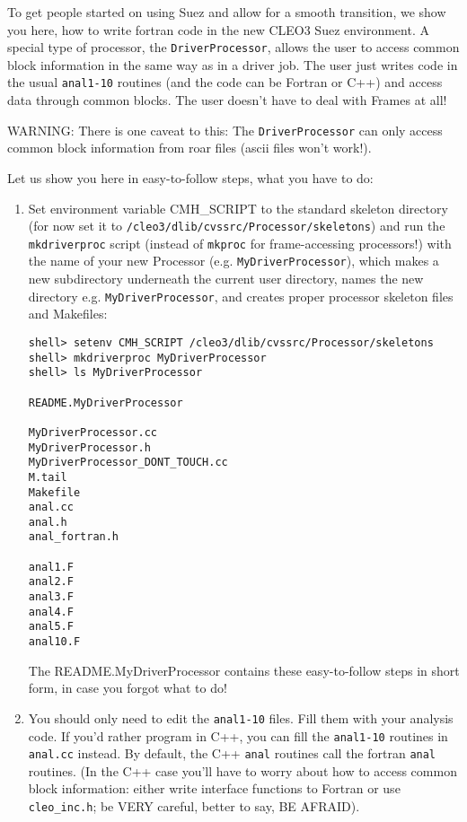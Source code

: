 \documentclass[12pt]{article}
\begin{document}
To get people started on using Suez and allow for a smooth transition,
we show you here, how to write fortran code in the new CLEO3 Suez
environment.  A special type of processor, the \texttt{DriverProcessor},
allows the user to access common block  information
in the same way as in a driver job.  The user just writes code in the
usual \texttt{anal1-10} routines (and the code can be Fortran or C++)
and access data through common blocks. The user doesn't have to deal
with Frames at all!

\noindent WARNING: There is one caveat to this: The
\texttt{DriverProcessor} can only access common block information from
roar files (ascii files won't work!).

Let us show you here in easy-to-follow steps, what you have to do:
%
\begin{enumerate}

\item Set environment variable CMH\_SCRIPT to the standard
skeleton directory (for now set it to
\texttt{/cleo3/dlib/cvssrc/Processor/skeletons}) and run the
\texttt{mkdriverproc} script (instead of \texttt{mkproc} for
frame-accessing processors!) with the name of your new Processor
(e.g. \texttt{MyDriverProcessor}), which makes a new subdirectory
underneath the current user directory, names the new directory
e.g. \texttt{MyDriverProcessor}, and creates proper processor skeleton
files and Makefiles:
\begin{verbatim}
shell> setenv CMH_SCRIPT /cleo3/dlib/cvssrc/Processor/skeletons
shell> mkdriverproc MyDriverProcessor
shell> ls MyDriverProcessor

README.MyDriverProcessor

MyDriverProcessor.cc
MyDriverProcessor.h
MyDriverProcessor_DONT_TOUCH.cc
M.tail
Makefile
anal.cc
anal.h
anal_fortran.h

anal1.F
anal2.F
anal3.F
anal4.F
anal5.F
anal10.F
\end{verbatim}

The README.MyDriverProcessor contains these easy-to-follow steps in
short form, in case you forgot what to do!

\item You should only need to edit the \texttt{anal1-10} files. Fill
them with your analysis code. If you'd rather program in C++, you can
fill the \texttt{anal1-10} routines in \texttt{anal.cc} instead. By
default, the C++ \texttt{anal} routines call the fortran \texttt{anal}
routines.  (In the C++ case you'll have to worry about how to access
common block information: either write interface functions to Fortran or
use \texttt{cleo\_inc.h}; be VERY careful, better to say, BE AFRAID).


\end{enumerate}
\end{document}
